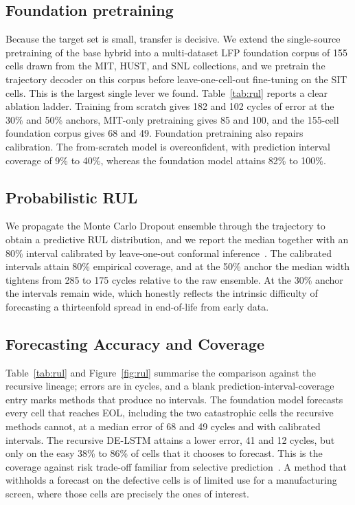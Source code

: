 \subsection{Foundation pretraining}\label{sec:rul_foundation}
Because the target set is small, transfer is decisive. We extend the single-source pretraining
of the base hybrid into a multi-dataset LFP foundation corpus of 155 cells drawn from the MIT,
HUST, and SNL collections, and we pretrain the trajectory decoder on this corpus before
leave-one-cell-out fine-tuning on the SIT cells. This is the largest single lever we found.
Table~\ref{tab:rul} reports a clear ablation ladder. Training from scratch gives 182 and 102
cycles of error at the 30\% and 50\% anchors, MIT-only pretraining gives 85 and 100, and the
155-cell foundation corpus gives 68 and 49. Foundation pretraining also repairs calibration. The
from-scratch model is overconfident, with prediction interval coverage of 9\% to 40\%, whereas
the foundation model attains 82\% to 100\%.

\subsection{Probabilistic RUL}\label{sec:rul_prob}
We propagate the Monte Carlo Dropout ensemble through the trajectory to obtain a predictive RUL
distribution, and we report the median together with an 80\% interval calibrated by
leave-one-out conformal inference~\cite{conformal_rul}. The calibrated intervals attain 80\%
empirical coverage, and at the 50\% anchor the median width tightens from 285 to 175 cycles
relative to the raw ensemble. At the 30\% anchor the intervals remain wide, which honestly
reflects the intrinsic difficulty of forecasting a thirteenfold spread in end-of-life from
early data.

\subsection{Forecasting Accuracy and Coverage}\label{sec:rul_results}
Table~\ref{tab:rul} and Figure~\ref{fig:rul} summarise the comparison against the recursive
lineage; errors are in cycles, and a blank prediction-interval-coverage entry marks methods
that produce no intervals. The foundation model forecasts every cell that reaches EOL, including the two
catastrophic cells the recursive methods cannot, at a median error of 68 and 49 cycles and with
calibrated intervals. The recursive DE-LSTM attains a lower error, 41 and 12 cycles, but only on
the easy 38\% to 86\% of cells that it chooses to forecast. This is the coverage against risk
trade-off familiar from selective prediction~\cite{reject_option}. A method that withholds a
forecast on the defective cells is of limited use for a manufacturing screen, where those cells
are precisely the ones of interest.


